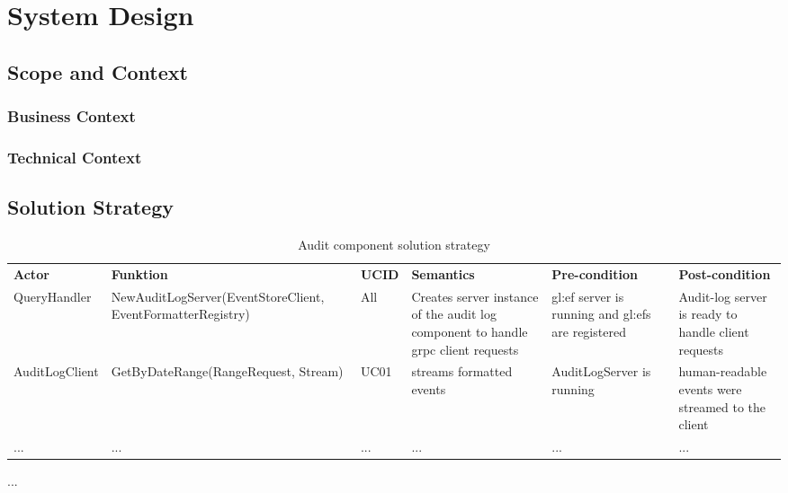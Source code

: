\section{System Design}


\subsection{Scope and Context}

\subsubsection{Business Context}


\subsubsection{Technical Context}


\subsection{Solution Strategy}

\begin{table}[H]
  \footnotesize
  \begin{center}
    \caption{Audit component solution strategy}
    \label{tab:acss}
    \def\arraystretch{1.5}
    \begin{tabularx}{\linewidth}{|l X l X X X |}
      \hline
      \rowcolor{gray!20}
      \textbf{Actor} & \textbf{Funktion} & \textbf{UCID} & \textbf{Semantics} & \textbf{Pre-condition} & \textbf{Post-condition}\\
      QueryHandler & New\-Audit\-Log\-Server\-(Event\-Store\-Client, Event\-Formatter\-Registry) & All & Creates server instance of the audit log component to handle grpc client requests & \gls{gl:ef} server is running and \glspl{gl:ef} are registered & Audit-log server is ready to handle client requests  \\
      AuditLogClient & Get\-By\-Date\-Range(Range\-Request, Stream) & UC01 & streams formatted events & Audit\-Log\-Server is running & human-readable events were streamed to the client  \\
      ... & ... & ... & ... & ... & ...  \\
      \hline
    \end{tabularx}
  \end{center}
\end{table}
...


